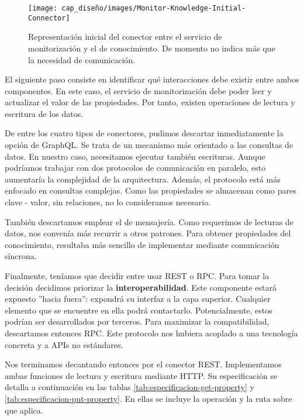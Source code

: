 \begin{wrapfigure}{r}{0.37\linewidth}
  \centering
  \vspace{23pt}
  \texttt{[image: cap\_diseño/images/Monitor-Knowledge-Initial-Connector]}
  \caption{Representación inicial del conector entre el servicio de monitorización y el de conocimiento. De momento no indica más que la necesidad de comunicación.}
  \label{fig:monitor-knowledge-initial}
  \vspace{2pt}
\end{wrapfigure}

El siguiente paso consiste en identificar qué interacciones debe existir entre ambos componentes. En este caso, el servicio de monitorización debe poder leer y actualizar el valor de las propiedades. Por tanto, existen operaciones de lectura y escritura de los datos.

De entre los cuatro tipos de conectores, pudimos descartar inmediatamente la opción de GraphQL. Se trata de un mecanismo más orientado a las consultas de datos. En nuestro caso, necesitamos ejecutar también escrituras. Aunque podríamos trabajar con dos protocolos de comunicación en paralelo, esto aumentaría la complejidad de la arquitectura. Además, el protocolo está más enfocado en consultas complejas. Como las propiedades se almacenan como pares clave - valor, sin relaciones, no lo consideramos necesario.

También descartamos emplear el  de mensajería. Como requerimos de lecturas de datos, nos convenía más recurrir a otros patrones. Para obtener propiedades del conocimiento, resultaba más sencillo de implementar mediante comunicación síncrona.

Finalmente, teníamos que decidir entre usar REST o RPC. Para tomar la decisión decidimos priorizar la \textbf{interoperabilidad}. Este componente estará expuesto ''hacia fuera'': expondrá su interfaz a la capa superior. Cualquier elemento que se encuentre en ella podrá contactarlo. Potencialmente, estos podrían ser desarrollados por terceros. Para maximizar la compatibilidad, descartamos entonces RPC. Este protocolo nos hubiera acoplado a una tecnología concreta y a APIs no estándares.

Nos terminamos decantando entonces por el conector REST. Implementamos ambas funciones de lectura y escritura mediante  HTTP. Su especificación se detalla a continuación en las tablas \ref{tab:especificacion-get-property} y \ref{tab:especificacion-put-property}. En ellas se incluye la operación y la ruta sobre que aplica.


